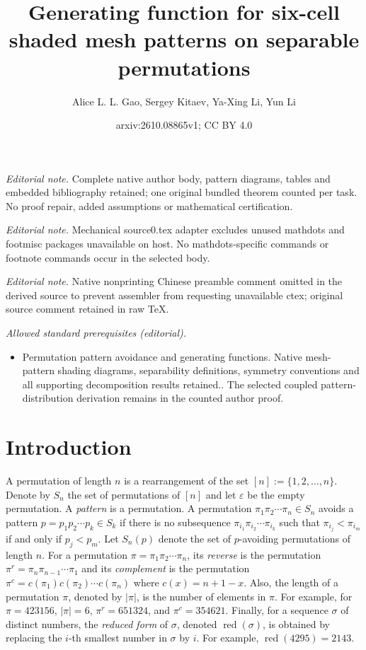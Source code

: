 \documentclass[10pt,a4paper]{article}
\title{Generating function for six-cell shaded mesh patterns on separable permutations}
\author{Alice L. L. Gao, Sergey Kitaev, Ya-Xing Li, Yun Li}
\date{arxiv:2610.08865v1; CC BY 4.0}
\DeclareMathOperator{\red}{red}
\begin{document}
\maketitle
\noindent\textit{Editorial note.} Complete native author body, pattern diagrams, tables and embedded bibliography retained; one original bundled theorem counted per task. No proof repair, added assumptions or mathematical certification.\par\medskip
\noindent\textit{Editorial note.} Mechanical source0.tex adapter excludes unused mathdots and footmisc packages unavailable on host. No mathdots-specific commands or footnote commands occur in the selected body.\par\medskip
\noindent\textit{Editorial note.} Native nonprinting Chinese preamble comment omitted in the derived source to prevent assembler from requesting unavailable ctex; original source comment retained in raw TeX.\par\medskip
\noindent\textit{Allowed standard prerequisites (editorial).}\begin{itemize}
\item Permutation pattern avoidance and generating functions. Native mesh-pattern shading diagrams, separability definitions, symmetry conventions and all supporting decomposition results retained.. The selected coupled pattern-distribution derivation remains in the counted author proof.
\end{itemize}\medskip
\section{Introduction}\label{intro}

A permutation of length $n$ is a rearrangement of the set $[n]:=\{1,2,\ldots,n\}$. Denote by  $S_n$  the set of permutations of $[n]$ and let $\varepsilon$ be the empty permutation. A {\em pattern} is a permutation. A permutation $\pi_1\pi_2\cdots\pi_n\in S_n$ avoids a pattern $p=p_1p_2\cdots p_k\in S_k$  if there is no subsequence $\pi_{i_1}\pi_{i_2}\cdots\pi_{i_k}$ such that $\pi_{i_j}<\pi_{i_m}$ if and only if $p_j<p_m$.  Let $S_n(p)$ denote the set of $p$-avoiding permutations of length $n$. For a permutation $\pi=\pi_1\pi_2\cdots\pi_n$, its {\em reverse} is the permutation $\pi^r=\pi_n\pi_{n-1}\cdots \pi_1$ and its {\em complement} is the permutation $\pi^c=c(\pi_1)c(\pi_2)\cdots c(\pi_n)$ where $c(x)=n+1-x$. Also, the length of a permutation $\pi$, denoted by $|\pi|$, is the number of elements in $\pi$. For example, for $\pi=423156$, $|\pi|=6$, $\pi^r=651324$, and $\pi^c=354621$. Finally, for a sequence $\sigma$ of distinct numbers, the {\em reduced form} of $\sigma$, denoted $\red(\sigma)$, is obtained by replacing the $i$-th smallest number in $\sigma$ by $i$. For example, $\red(4295)=2143$. 
\end{document}
